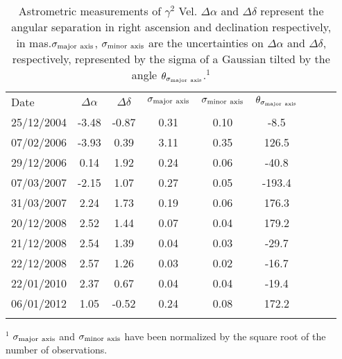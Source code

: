 \documentclass[usenatbib]{mnras}%
\begin{document}
\begin{table}
  \caption[]{Astrometric measurements of $\gamma^2$ Vel. $\Delta\alpha$ and $\Delta\delta$ represent the angular separation in right ascension and declination respectively, in mas.$\sigma_{\rm major\ axis}$, $\sigma_{\rm minor\ axis}$ are the uncertainties on $\Delta\alpha$ and $\Delta\delta$, respectively, represented by the sigma of a Gaussian tilted by the angle $\theta_{\sigma_{\rm major\ axis}}$.$^1$}
  \label{tab:astrometry}
    \begin{tabular}{lcccccccc}
    \hline
    \noalign{\smallskip}
    Date & $\Delta\alpha$ & $\Delta\delta$ & $\sigma_{\rm major\ axis}$ &  $\sigma_{\rm minor\ axis}$ & $\theta_{\sigma_{\rm major\ axis}}$ \\ 
    \noalign{\smallskip}
  \hline
    25/12/2004 & -3.48 & -0.87 & 0.31 & 0.10 &   -8.5 \\
    07/02/2006 & -3.93 &  0.39 & 3.11 & 0.35 &  126.5 \\ 
    29/12/2006 &  0.14 &  1.92 & 0.24 & 0.06 &  -40.8 \\
    07/03/2007 & -2.15 &  1.07 & 0.27 & 0.05 &  -193.4 \\
    31/03/2007 &  2.24 &  1.73 & 0.19 & 0.06 &  176.3 \\
    20/12/2008 &  2.52 &  1.44 & 0.07 & 0.04 &  179.2 \\
    21/12/2008 &  2.54 &  1.39 & 0.04 & 0.03 &  -29.7 \\
    22/12/2008 &  2.57 &  1.26 & 0.03 & 0.02 &  -16.7 \\
    22/01/2010 &  2.37 &  0.67 & 0.04 & 0.04 &  -19.4 \\
    06/01/2012 &  1.05 & -0.52 & 0.24 & 0.08 &  172.2 \\
   \noalign{\smallskip}
    \hline
  \end{tabular}
$^1$ $\sigma_{\rm major\ axis}$ and $\sigma_{\rm minor\ axis}$ have been normalized by the square root of the number of observations.
\end{table}
\end{document}
